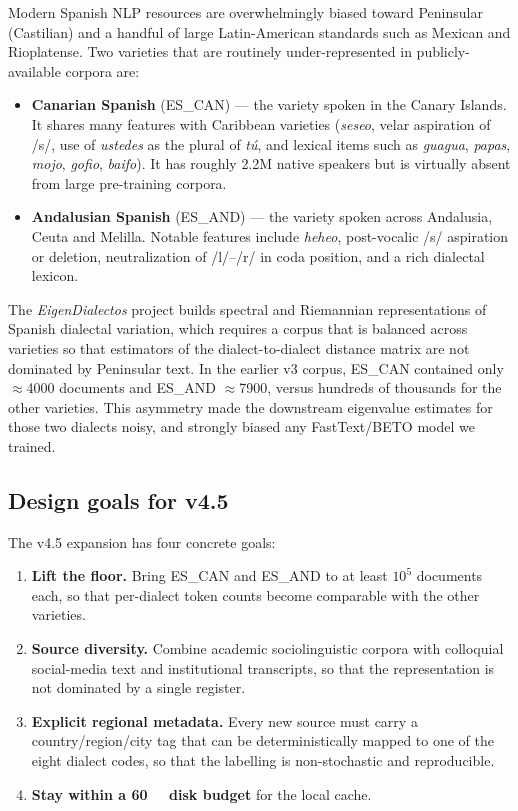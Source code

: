 \documentclass[11pt,a4paper]{article}
\begin{document}
Modern Spanish NLP resources are overwhelmingly biased toward Peninsular
(Castilian) and a handful of large Latin-American standards such as Mexican
and Rioplatense. Two varieties that are routinely under-represented in
publicly-available corpora are:
\begin{itemize}
  \item \textbf{Canarian Spanish} (ES\_CAN) --- the variety spoken in the
        Canary Islands. It shares many features with Caribbean varieties
        (\emph{seseo}, velar aspiration of /s/, use of
        \emph{ustedes} as the plural of \emph{tú}, and lexical items such
        as \emph{guagua}, \emph{papas}, \emph{mojo}, \emph{gofio},
        \emph{baifo}). It has roughly 2.2M native speakers but is virtually
        absent from large pre-training corpora.
  \item \textbf{Andalusian Spanish} (ES\_AND) --- the variety spoken across
        Andalusia, Ceuta and Melilla. Notable features include
        \emph{heheo}, post-vocalic /s/ aspiration or deletion,
        neutralization of /l/--/r/ in coda position, and a rich
        dialectal lexicon.
\end{itemize}

The \emph{EigenDialectos} project builds spectral and Riemannian
representations of Spanish dialectal variation, which requires a corpus
that is balanced across varieties so that estimators of the
dialect-to-dialect distance matrix are not dominated by Peninsular text.
In the earlier v3 corpus, ES\_CAN contained only $\approx$\num{4000}
documents and ES\_AND $\approx$\num{7900}, versus hundreds of thousands
for the other varieties. This asymmetry made the downstream eigenvalue
estimates for those two dialects noisy, and strongly biased any
FastText/BETO model we trained.

\subsection{Design goals for v4.5}

The v4.5 expansion has four concrete goals:

\begin{enumerate}[label=\textbf{G\arabic*.}]
  \item \textbf{Lift the floor.} Bring ES\_CAN and ES\_AND to at least
        $10^5$ documents each, so that per-dialect token counts become
        comparable with the other varieties.
  \item \textbf{Source diversity.} Combine academic sociolinguistic
        corpora with colloquial social-media text and institutional
        transcripts, so that the representation is not dominated by a
        single register.
  \item \textbf{Explicit regional metadata.} Every new source must carry
        a country/region/city tag that can be deterministically mapped to
        one of the eight dialect codes, so that the labelling is
        non-stochastic and reproducible.
  \item \textbf{Stay within a \SI{60}{\giga\byte} disk budget} for the
        local cache.
\end{enumerate}
\end{document}
